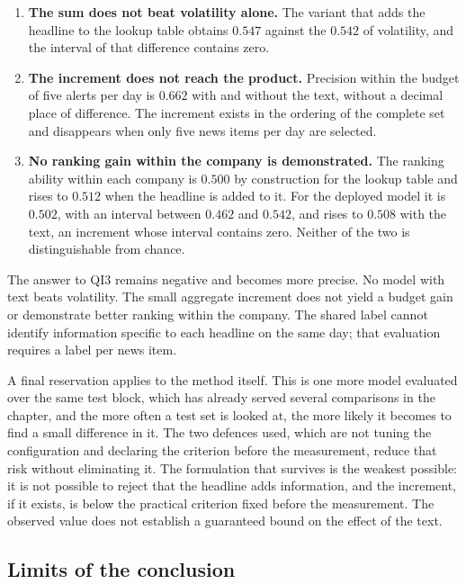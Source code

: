 \begin{enumerate}
\item \textbf{The sum does not beat volatility alone.} The variant that adds the headline to the
lookup table obtains $0.547$ against the $0.542$ of volatility, and the interval of that difference
contains zero.

\item \textbf{The increment does not reach the product.} Precision within the budget of five alerts
per day is $0.662$ with and without the text, without a decimal place of difference. The increment
exists in the ordering of the complete set and disappears when only five news items per day are
selected.

\item \textbf{No ranking gain within the company is demonstrated.} The ranking ability
within each company is $0.500$ by construction for the lookup table and rises to $0.512$ when the
headline is added to it. For the deployed model it is $0.502$, with an interval between $0.462$ and
$0.542$, and rises to $0.508$ with the text, an increment whose interval contains zero. Neither of
the two is distinguishable from chance.
\end{enumerate}

The answer to \gls{QI}3 remains negative and becomes more precise. No model with text beats
volatility. The small aggregate increment does not yield a budget gain or demonstrate better
ranking within the company. The shared label cannot identify information specific to each
headline on the same day; that evaluation requires a label per news item.

A final reservation applies to the method itself. This is one more model evaluated over the same
test block, which has already served several comparisons in the chapter, and the more often a test
set is looked at, the more likely it becomes to find a small difference in it. The two defences
used, which are not tuning the configuration and declaring the criterion before the measurement,
reduce that risk without eliminating it. The formulation that survives is the weakest possible: it
is not possible to reject that the headline adds information, and the increment, if it exists, is
below the practical criterion fixed before the measurement. The observed value does not establish
a guaranteed bound on the effect of the text.

\subsection{Limits of the conclusion}

